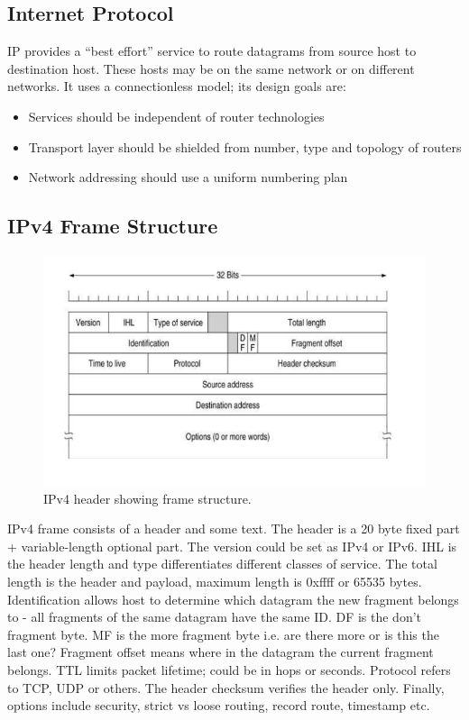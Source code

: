 \documentclass[twoside]{article}
\begin{document}
\subsection{Internet Protocol}
IP provides a ``best effort'' service to route datagrams from source host to 
destination host. These hosts may be on the same network or on different
networks. It uses a connectionless model; its design goals are:
\begin{itemize}
    \item Services should be independent of router technologies
    \item Transport layer should be shielded from number, type and topology of 
    routers
    \item Network addressing should use a uniform numbering plan
\end{itemize}
\subsection{IPv4 Frame Structure}
\begin{figure}
  \includegraphics[width=\linewidth]{ipv4-header.png}
  \caption{IPv4 header showing frame structure.}
  \label{fig:ipv4-header}
\end{figure}
IPv4 frame consists of a header and some text. The header is a 20 byte fixed 
part + variable-length optional part. The version could be set as IPv4 or IPv6.
IHL is the header length and type differentiates different classes of service.
The total length is the header and payload, maximum length is 0xffff or 
65535 bytes. Identification allows host to determine which datagram the new 
fragment belongs to - all fragments of the same datagram have the same ID. 
DF is the don't fragment byte. MF is the more fragment byte i.e. are there more
or is this the last one? Fragment offset means where in the datagram the 
current fragment belongs. TTL limits packet lifetime; could be in hops or 
seconds. Protocol refers to TCP, UDP or others. The header checksum verifies
the header only. Finally, options include security, strict vs loose routing,
record route, timestamp etc.
\end{document}
